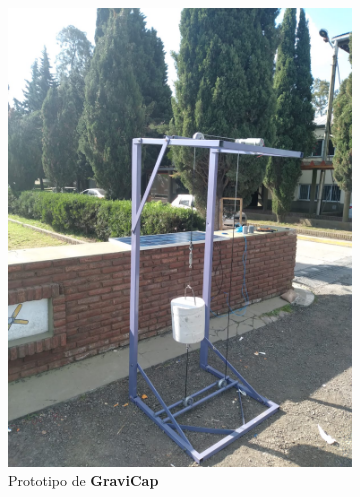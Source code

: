             \begin{figure}[H]
                \centering
                \begin{subfigure}[b]{0.3\textwidth}
                    \centering
                    \includegraphics[width=\textwidth]{Estructura/Prototipo.png}
                    \caption{Prototipo de \textcolor{dark_violet}{\textbf{GraviCap}}}
                    \label{fig:e1.1}
                \end{subfigure}
                \begin{subfigure}[b]{0.3\textwidth}
                    \centering

\end{subfigure}
\end{figure}
